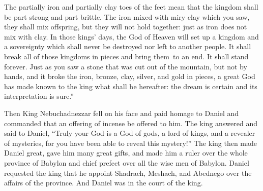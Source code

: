 \begin{inparaenum}
     The partially iron and partially clay toes of the feet mean that the kingdom shall be part strong and part brittle.%
     The iron mixed with miry clay which you saw, they shall mix offspring, but they will not hold together: just as iron does not mix with clay.%
     In those kings' days, the God of Heaven will set up a kingdom and a sovereignty which shall never be destroyed nor left to another people. It shall break all of those kingdoms in pieces and bring them\understood\ to an end. It shall stand forever.%
     Just as you saw a stone that was cut out of the mountain, but not by hands, and it broke the iron, bronze, clay, silver, and gold in pieces, a great God has made known to the king what shall be hereafter: the dream is certain and its interpretation is sure.''%
    
     Then King Nebuchadnezzar fell on his face and paid homage to Daniel and commanded that an offering of incense be offered to him.%
     The king answered and said to Daniel, ``Truly your God is a God of gods, a lord of kings, and a revealer of mysteries, for you have been able to reveal this mystery!''%
     The king then made Daniel great, gave him many great gifts, and made him a ruler over the whole province of Babylon and chief prefect over all the wise men of Babylon.%
     Daniel requested the king that he appoint Shadrach, Meshach, and Abednego over the affairs of the province. And Daniel was in the court of the king.%
\end{inparaenum}
